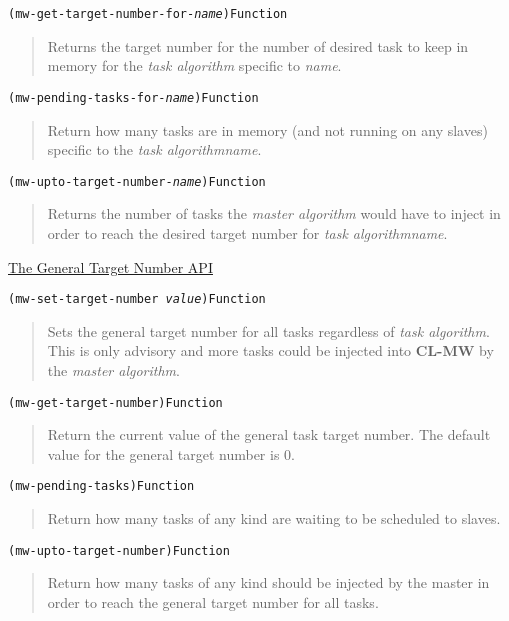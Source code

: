 \documentclass[titlepage,12pt]{book}
\newcommand{\xsmall}{\latexhtml{\small}{}}
\newcommand{\xnormalsize}{\latexhtml{\normalsize}{}}
\newcommand{\clmw}{\xsmall\textbf{CL-MW}\xnormalsize\xspace}
\newcommand{\ma}{\textit{master algorithm}\xspace}
\newcommand{\ta}{\textit{task algorithm}\xspace}
\newcommand{\apiheader}[1]{\begin{center}\underline{#1}\end{center}}
\newcommand{\apifunc}[2]{\noindent\xsmall\texttt{(#1)}\hspace*{\fill}\xnormalsize\texttt{#2}}
\newenvironment{apientry}[2]
	{\apifunc{#1}{#2}\begin{quotation}}
	{\end{quotation}}
\begin{document}
\begin{apientry}
{mw-get-target-number-for-\textit{name}}
{Function}
Returns the target number for the number of desired task to
keep in memory for the \ta specific to \emph{name}.
\end{apientry}

\begin{apientry}
{mw-pending-tasks-for-\textit{name}}
{Function}
Return how many tasks are in memory (and not running on any slaves) specific
to the \ta \emph{name}.
\end{apientry}

\begin{apientry}
{mw-upto-target-number-\textit{name}}
{Function}
Returns the number of tasks the \ma would have to inject in order
to reach the desired target number for \ta \emph{name}.
\end{apientry}

\apiheader{The General Target Number API}
\begin{apientry}
{mw-set-target-number \emph{value}}
{Function}
Sets the general target number for all tasks regardless of \ta. This is
only advisory and more tasks could be injected into \clmw by the \ma.
\end{apientry}

\begin{apientry}
{mw-get-target-number}
{Function}
Return the current value of the general task target number. The
default value for the general target number is 0.
\end{apientry}

\begin{apientry}
{mw-pending-tasks}
{Function}
Return how many tasks of any kind are waiting to be scheduled to slaves.
\end{apientry}

\begin{apientry}
{mw-upto-target-number}
{Function}
Return how many tasks of any kind should be injected by the master in order
to reach the general target number for all tasks.
\end{apientry}
\end{document}
